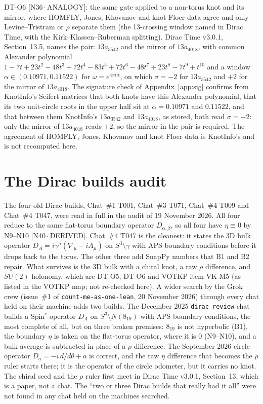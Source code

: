 \documentclass[11pt]{article}
\theoremstyle{definition}
\newcommand{\dtag}[1]{#1}
\begin{document}
DT-O6 \dtag{\textsf{\small[N36\,$\cdot$\,ANALOGY]}}: the same gate applied to a non-torus knot and its mirror, where HOMFLY, Jones, Khovanov and knot Floer data agree and only Levine--Tristram or $\rho$ separate them (the 13-crossing window named in Dirac Time, with the Kirk--Klassen--Ruberman splitting). Dirac Time v3.0.1, Section~13.5, names the pair: $13a_{3542}$ and the mirror of $13a_{4018}$, with common Alexander polynomial $1-7t+23t^2-48t^3+72t^4-83t^5+72t^6-48t^7+23t^8-7t^9+t^{10}$ and a window $\alpha\in(0.10971,0.11522)$ for $\omega=e^{4\pi i\alpha}$, on which $\sigma=-2$ for $13a_{3542}$ and $+2$ for the mirror of $13a_{4018}$. The signature check of Appendix~\ref{app:sig} confirms from KnotInfo's Seifert matrices that both knots have this Alexander polynomial, that its two unit-circle roots in the upper half sit at $\alpha=0.10971$ and $0.11522$, and that between them KnotInfo's $13a_{3542}$ and $13a_{4018}$, as stored, both read $\sigma=-2$: only the mirror of $13a_{4018}$ reads $+2$, so the mirror in the pair is required. The agreement of HOMFLY, Jones, Khovanov and knot Floer data is KnotInfo's and is not recomputed here.

\section{The Dirac builds audit}
The four old Dirac builds, Chat~\#1 T001, Chat~\#3 T071, Chat~\#4 T009 and Chat~\#4 T047, were read in full in the audit of 19 November 2026. All four reduce to the same flat-torus boundary operator $D_{\alpha,\beta}$, so all four have $\eta\equiv0$ by N9--N10 \dtag{\textsf{\small[N40\,$\cdot$\,DERIVED]}}. Chat~\#4 T047 is the cleanest: it states the 3D bulk operator $D_A=i\gamma^\mu(\nabla_\mu-iA_\mu)$ on $S^3\setminus\gamma$ with APS boundary conditions before it drops back to the torus. The other three add SnapPy numbers that B1 and B2 repair. What survives is the 3D bulk with a chiral knot, a raw $\rho$ difference, and $SU(2)$ holonomy, which are DT-O5, DT-O6 and VOTKP item VK-M5 (as listed in the VOTKP map; not re-checked here). A wider search by the Grok crew (issue~\#1 of \texttt{count-me-as-one-lean}, 20 November 2026) through every chat held on their machine adds two builds. The December 2025 \texttt{dirac\_review} chat builds a $\mathrm{Spin}^c$ operator $D_A$ on $S^3\setminus N(8_{19})$ with APS boundary conditions, the most complete of all, but on three broken premises: $8_{19}$ is not hyperbolic (B1), the boundary $\eta$ is taken on the flat-torus operator, where it is $0$ (N9--N10), and a bulk average is subtracted in place of a $\rho$ difference. The September 2026 circle operator $D_a=-i\,d/d\theta+a$ is correct, and the raw $\eta$ difference that becomes the $\rho$ ruler starts there; it is the operator of the circle odometer, but it carries no knot. The chiral seed and the $\rho$ ruler first meet in Dirac Time v3.0.1, Section~13, which is a paper, not a chat. The ``two or three Dirac builds that really had it all'' were not found in any chat held on the machines searched.
\end{document}

